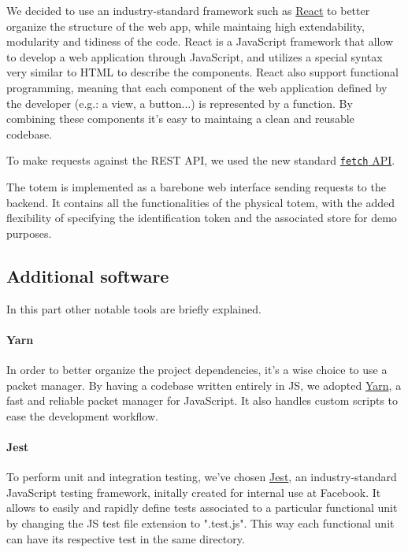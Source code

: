 \documentclass[
]{article}
\begin{document}
We decided to use an industry-standard framework such as
\href{https://reactjs.org/}{React} to better organize the structure of
the web app, while maintaing high extendability, modularity and tidiness
of the code. React is a JavaScript framework that allow to develop a web application through JavaScript, and utilizes a special syntax very similar to HTML to describe the components. React also support functional programming, meaning that each component of the web application defined by the developer (e.g.: a view, a button...) is represented by a function. By combining these components it's easy to maintaing a clean and reusable codebase.

To make requests against the REST API, we used the
new standard
\href{https://developer.mozilla.org/en-US/docs/Web/API/Fetch_API}{\texttt{fetch}
API}.

The totem is implemented as a barebone web interface sending requests to the backend. It contains all the functionalities of the physical totem, with the added flexibility of specifying the identification token and the associated store for demo purposes.

\hypertarget{additional-software}{%
\subsection{Additional software}\label{additional-software}}

In this part other notable tools are briefly explained.

\hypertarget{yarn}{%
\paragraph{Yarn}\label{yarn}}

In order to better organize the project dependencies, it's a wise choice
to use a packet manager. By having a codebase written entirely in JS, we
adopted \href{https://yarnpkg.com/}{Yarn}, a fast and reliable packet
manager for JavaScript. It also handles custom scripts to ease the
development workflow.

\hypertarget{jest}{%
\paragraph{Jest}\label{jest}}

To perform unit and integration testing, we've chosen
\href{https://jestjs.io/}{Jest}, an industry-standard JavaScript testing
framework, initally created for internal use at Facebook. It allows to easily and rapidly define tests associated to a particular functional unit by changing the JS test file extension to ".test.js". This way each functional unit can have its respective test in the same directory.
\end{document}

